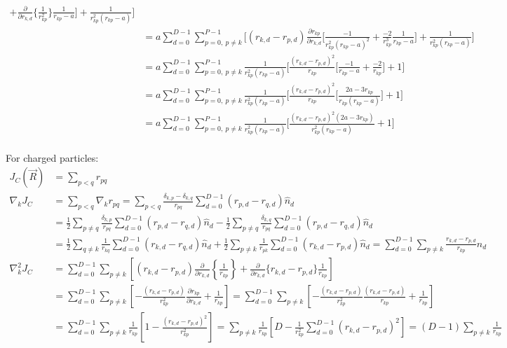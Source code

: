 \documentclass[12pt]{article}
\begin{document}
\begin{align*}
+\frac{\partial}{\partial r_{k,d}} \bigg\{ \frac{1}{r_{kp}^2}  \bigg\} \frac{1}{r_{kp}-a}
\bigg]
 + \frac{1}{r_{kp}^2(r_{kp}-a)}
\Bigg] \\
&= a \sum_{d=0}^{D-1} \sum_{p=0, \ p\neq k}^{P-1} \Bigg[ 
(r_{k,d}-r_{p,d}) \frac{\partial r_{kp}}{\partial r_{k,d}} 
\bigg[ 
\frac{-1}{r_{kp}^2(r_{kp}-a)^2}
+ \frac{-2}{r_{kp}^3} 
 \frac{1}{r_{kp}-a}\bigg]
 + \frac{1}{r_{kp}^2(r_{kp}-a)}
\Bigg] \\
&= a \sum_{d=0}^{D-1} \sum_{p=0, \ p\neq k}^{P-1}
\frac{1}{r_{kp}^2(r_{kp}-a)}
 \Bigg[ 
\frac{(r_{k,d}-r_{p,d})^2}{r_{kp}} 
\bigg[ 
\frac{-1}{r_{kp}-a}
+ \frac{-2}{r_{kp}} \bigg]
 + 1 \Bigg] \\
&= a \sum_{d=0}^{D-1} \sum_{p=0, \ p\neq k}^{P-1}
\frac{1}{r_{kp}^2(r_{kp}-a)}
 \Bigg[ 
\frac{(r_{k,d}-r_{p,d})^2}{r_{kp}} 
\bigg[ 
\frac{2a-3r_{kp}}{r_{kp}(r_{kp}-a)} \bigg]
 + 1 \Bigg] \\
&= a \sum_{d=0}^{D-1} \sum_{p=0, \ p\neq k}^{P-1}
\frac{1}{r_{kp}^2(r_{kp}-a)}
 \Bigg[ 
 \frac{(r_{k,d}-r_{p,d})^2 (2a-3r_{kp})}{r_{kp}^2(r_{kp}-a)}  + 1
 \Bigg] \\
\end{align*}

\noindent For charged particles:
\begin{align*}
J_C (\vec{R}) &= \sum_{p<q} r_{pq} \\
\nabla_k J_C &= \sum_{p<q} \nabla_k r_{pq} = \sum_{p<q} \frac{\delta_{k,p}-\delta_{k,q}}{r_{pq}} \sum_{d=0}^{D-1} (r_{p,d}-r_{q,d}) \hat{n}_{d}\\
&= \frac{1}{2} \sum_{p\neq q} \frac{\delta_{k,p}}{r_{pq}} \sum_{d=0}^{D-1} (r_{p,d}-r_{q,d}) \hat{n}_{d} - \frac{1}{2} \sum_{p\neq q} \frac{\delta_{k,q}}{r_{pq}} \sum_{d=0}^{D-1} (r_{p,d}-r_{q,d}) \hat{n}_{d}\\
&= \frac{1}{2} \sum_{q\neq k} \frac{1}{r_{kq}} \sum_{d=0}^{D-1} (r_{k,d}-r_{q,d}) \hat{n}_{d} + \frac{1}{2} \sum_{p\neq k} \frac{1}{r_{pk}} \sum_{d=0}^{D-1} (r_{k,d}-r_{p,d}) \hat{n}_{d}= \sum_{d=0}^{D-1} \sum_{p\neq k} \frac{r_{k,d}-r_{p,d}}{r_{kp}} \hat{n}_{d}\\
\nabla_k^2 J_C 
&= \sum_{d=0}^{D-1} \sum_{p\neq k} \left[
(r_{k,d}-r_{p,d}) \frac{\partial}{\partial r_{k,d}} \left\{ \frac{1}{r_{kp}} \right\} + \frac{\partial}{\partial r_{k,d}} \Big\{ r_{k,d}-r_{p,d} \Big\} \frac{1}{r_{kp}} 
 \right]\\
 &= \sum_{d=0}^{D-1} \sum_{p\neq k} \left[
-\frac{(r_{k,d}-r_{p,d})}{r_{kp}^2} \frac{\partial r_{kp}}{\partial r_{k,d}}  + \frac{1}{r_{kp}} 
 \right]
 = \sum_{d=0}^{D-1} \sum_{p\neq k} \left[
-\frac{(r_{k,d}-r_{p,d})}{r_{kp}^2} \frac{(r_{k,d}-r_{p,d})}{r_{kp}}  + \frac{1}{r_{kp}} 
 \right]\\
 &= \sum_{d=0}^{D-1} \sum_{p\neq k} \frac{1}{r_{kp}}
  \left[ 1
-\frac{(r_{k,d}-r_{p,d})^2}{r_{kp}^2}  
 \right] = \sum_{p \neq k} \frac{1}{r_{kp}} 
 \left[  D - \frac{1}{r_{kp}^2} \sum_{d=0}^{D-1} (r_{k,d}-r_{p,d})^2
 \right] = (D-1) \sum_{p\neq k} \frac{1}{r_{kp}} \\
\end{align*}
\end{document}

